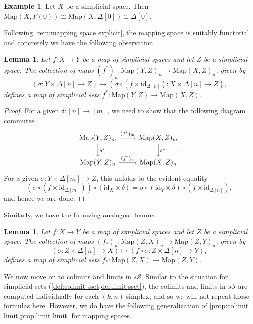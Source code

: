 \documentclass[11pt, a4paper]{amsart}
\newcommand{\Map}{\mathrm{Map}}
\newcommand{\sSp}{s\mathscr{S}}
\newcommand{\id}{\mathrm{id}}
\newtheorem{lemma}[equation]{Lemma}
\theoremstyle{definition}
\newtheorem{example}[equation]{Example}
\theoremstyle{remark}
\numberwithin{equation}{section}
\begin{document}
\begin{example} \label{ex:final}
 Let $X$ be a simplicial space. Then $\Map(X, F(0)) \cong \Map(X,\Delta[0]) \cong \Delta[0]$.
\end{example}

Following \cref{rem:mapping space explicit}, the mapping space is suitably functorial and concretely we have the following observation.

\begin{lemma}
  Let $f\colon X \to Y$ be a map of simplicial spaces and let $Z$ be a simplicial space. The collection of maps $(f^*)_n\colon \Map(Y,Z)_n \to \Map(X,Z)_n$, given by 
  \[ (\sigma\colon Y \times \Delta[n] \to Z) \mapsto (\sigma \circ (f \times \id_{\Delta[n]})\colon X \times \Delta[n] \to Z),\]
  defines a map of simplicial sets $f^*\colon \Map(Y,Z) \to \Map(X,Z)$. 
\end{lemma}

\begin{proof}
 For a given $\delta\colon [n] \to [m]$, we need to show that the following diagram commutes
  \[
  \begin{tikzcd}
    \Map(Y,Z)_m \arrow[r, "{(f^*)_m}"] \arrow[d, "{\delta^*}"] & \Map(X,Z)_m \arrow[d, "{\delta^*}"] \\
    \Map(Y,Z)_n \arrow[r, "{(f^*)_n}"] & \Map(X,Z)_n
  \end{tikzcd}.
  \]  
  For a given $\sigma \colon Y \times \Delta[m] \to Z$, this unfolds to the evident equality
  \[(\sigma \circ (f \times \id_{\Delta[m]})) \circ (\id_X \times \delta) = \sigma \circ (\id_Y \times \delta) \circ (f \times \id_{\Delta[n]}),\]
  and hence we are done.
\end{proof}

Similarly, we have the following analogous lemma.

\begin{lemma}
  Let $f\colon X \to Y$ be a map of simplicial spaces and let $Z$ be a simplicial space. The collection of maps $(f_*)_n\colon \Map(Z,X)_n \to \Map(Z,Y)_n$, given by 
  \[ (\sigma\colon Z \times \Delta[n] \to X) \mapsto (f \circ \sigma \colon Z \times \Delta[n] \to Y),\]
  defines a map of simplicial sets $f_*\colon \Map(Z,X) \to \Map(Z,Y)$. 
\end{lemma}


We now move on to colimits and limits in $\sSp$. Similar to the situation for simplicial sets (\cref{def:colimit sset,def:limit sset}), the colimits and limits in $\sSp$ are computed individually for each $(k,n)$-simplex, and so we will not repeat those formulas here. However, we do have the following generalization of \cref{prop:colimit limit,prop:limit limit} for mapping spaces.
\end{document}
